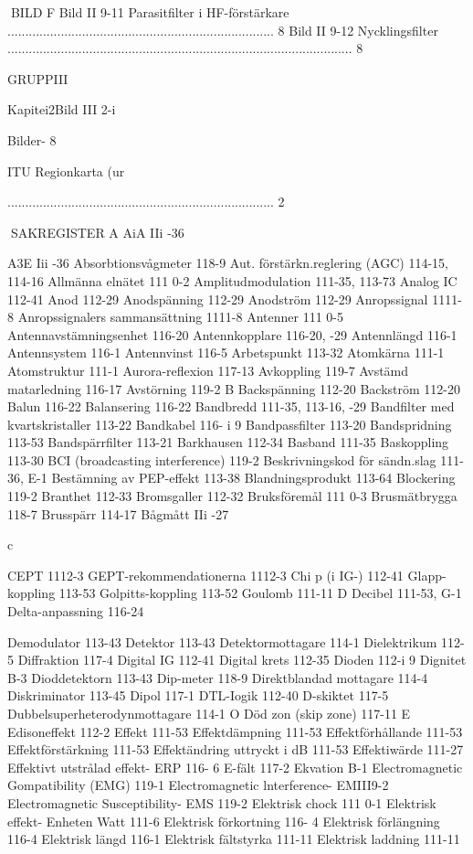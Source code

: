\documentclass[a4paper,twoside,twocolumn,openright]{book}
\begin{document}
{{{{{{{{{{{BILD F
Bild II 9-11 Parasitfilter i HF-förstärkare ........................................................................... 8
Bild II 9-12 Nycklingsfilter ................................................................................................. 8

GRUPPIII

Kapitei2Bild III 2-i

Bilder- 8

ITU Regionkarta (ur

........................................................................... 2

SAKREGISTER
A
AiA IIi -36

A3E Iii -36
Absorbtionsvågmeter 118-9
Aut. förstärkn.reglering (AGC) 114-15, 114-16
Allmänna elnätet 111 0-2
Amplitudmodulation 111-35, 113-73
Analog IC 112-41
Anod 112-29
Anodspänning 112-29
Anodström 112-29
Anropssignal 1111-8
Anropssignalers sammansättning 1111-8
Antenner 111 0-5
Antennavstämningsenhet 116-20
Antennkopplare 116-20, -29
Antennlängd 116-1
Antennsystem 116-1
Antennvinst 116-5
Arbetspunkt 113-32
Atomkärna 111-1
Atomstruktur 111-1
Aurora-reflexion 117-13
Avkoppling 119-7
Avstämd matarledning 116-17
Avstörning 119-2
B
Backspänning 112-20
Backström 112-20
Balun 116-22
Balansering 116-22
Bandbredd 111-35, 113-16, -29
Bandfilter med kvartskristaller 113-22
Bandkabel 116- i 9
Bandpassfilter 113-20
Bandspridning 113-53
Bandspärrfilter 113-21
Barkhausen 112-34
Basband 111-35
Baskoppling 113-30
BCI (broadcasting interference) 119-2
Beskrivningskod för sändn.slag 111-36, E-1
Bestämning av PEP-effekt 113-38
Blandningsprodukt 113-64
Blockering 119-2
Branthet 112-33
Bromsgaller 112-32
Bruksföremål 111 0-3
Brusmätbrygga 118-7
Brusspärr 114-17
Bågmått IIi -27

c

CEPT 1112-3
GEPT-rekommendationerna 1112-3
Chi p (i IG-) 112-41
Glapp-koppling 113-53
Golpitts-koppling 113-52
Goulomb 111-11
D
Decibel 111-53, G-1
Delta-anpassning 116-24

Demodulator 113-43
Detektor 113-43
Detektormottagare 114-1
Dielektrikum 112-5
Diffraktion 117-4
Digital IG 112-41
Digital krets 112-35
Dioden 112-i 9
Dignitet B-3
Dioddetektorn 113-43
Dip-meter 118-9
Direktblandad mottagare 114-4
Diskriminator 113-45
Dipol 117-1
DTL-Iogik 112-40
D-skiktet 117-5
Dubbelsuperheterodynmottagare 114-1 O
Död zon (skip zone) 117-11
E
Edisoneffekt 112-2
Effekt 111-53
Effektdämpning 111-53
Effektförhållande 111-53
Effektförstärkning 111-53
Effektändring uttryckt i dB 111-53
Effektiwärde 111-27
Effektivt utstrålad effekt- ERP 116- 6
E-fält 117-2
Ekvation B-1
Electromagnetic Gompatibility (EMG) 119-1
Electromagnetic lnterference- EMIII9-2
Electromagnetic Susceptibility- EMS 119-2
Elektrisk chock 111 0-1
Elektrisk effekt- Enheten Watt 111-6
Elektrisk förkortning 116- 4
Elektrisk förlängning 116-4
Elektrisk längd 116-1
Elektrisk fältstyrka 111-11
Elektrisk laddning 111-11

}}}}}}}}}}}
\end{document}
